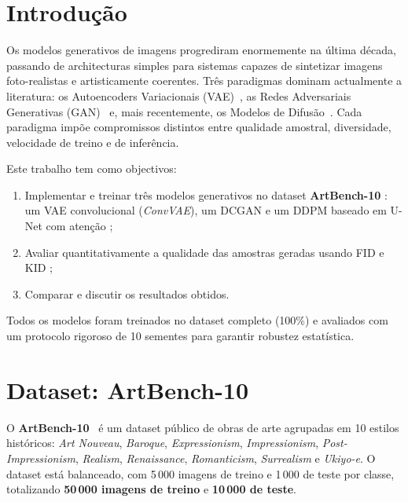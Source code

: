 \documentclass[12pt,a4paper]{article}
\begin{document}
\tableofcontents
\newpage

\section{Introdução}

Os modelos generativos de imagens progrediram enormemente na última década, passando
de architecturas simples para sistemas capazes de sintetizar imagens foto-realistas
e artisticamente coerentes. Três paradigmas dominam actualmente a literatura:
os Autoencoders Variacionais (VAE)~\cite{kingma2013vae}, as Redes Adversariais
Generativas (GAN)~\cite{goodfellow2014gans} e, mais recentemente, os Modelos de
Difusão~\cite{ho2020ddpm}. Cada paradigma impõe compromissos distintos entre
qualidade amostral, diversidade, velocidade de treino e de inferência.

Este trabalho tem como objectivos:
\begin{enumerate}
  \item Implementar e treinar três modelos generativos no dataset \textbf{ArtBench-10}
        \cite{liao2022artbench}: um VAE convolucional (\textit{ConvVAE}), um DCGAN
        \cite{radford2015dcgan} e um DDPM baseado em U-Net com atenção
        \cite{ho2020ddpm};
  \item Avaliar quantitativamente a qualidade das amostras geradas usando FID
        \cite{heusel2017fid} e KID \cite{binkowski2018kid};
  \item Comparar e discutir os resultados obtidos.
\end{enumerate}

Todos os modelos foram treinados no dataset completo (100\%) e avaliados com um
protocolo rigoroso de 10 sementes para garantir robustez estatística.

\section{Dataset: ArtBench-10}

O \textbf{ArtBench-10}~\cite{liao2022artbench} é um dataset público de obras de arte
agrupadas em 10 estilos históricos:
\textit{Art Nouveau}, \textit{Baroque}, \textit{Expressionism},
\textit{Impressionism}, \textit{Post-Impressionism}, \textit{Realism},
\textit{Renaissance}, \textit{Romanticism}, \textit{Surrealism} e
\textit{Ukiyo-e}.
O dataset está balanceado, com 5\,000 imagens de treino e 1\,000 de teste por classe,
totalizando \textbf{50\,000 imagens de treino} e \textbf{10\,000 de teste}.
\end{document}
